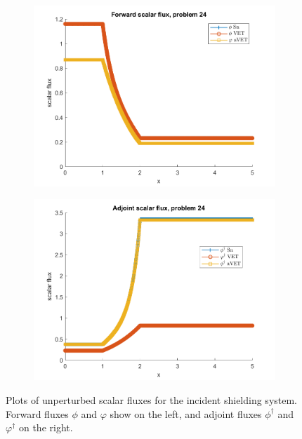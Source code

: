 \documentclass[12pt]{report}
\begin{document}
\begin{figure}[H]
\centering
\begin{subfigure}{.5\textwidth}
  \centering
  \includegraphics[width=.98\linewidth]{figures2/24phi.png}
\end{subfigure}%
\begin{subfigure}{.5\textwidth}
  \centering
  \includegraphics[width=.98\linewidth]{figures2/24phia.png}
\end{subfigure}
\caption{Plots of unperturbed scalar fluxes for the incident shielding system. Forward fluxes $\phi$ and $\varphi$ show on the left, and adjoint fluxes $\phi^\dag$ and $\varphi^\dag$ on the right.}
\label{Flux3}
\end{figure}
\end{document}

